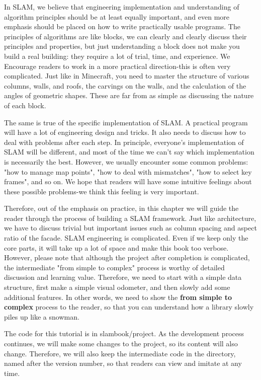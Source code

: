 In SLAM, we believe that engineering implementation and understanding of algorithm principles should be at least equally important, and even more emphasis should be placed on how to write practically usable programs. The principles of algorithms are like blocks, we can clearly and clearly discuss their principles and properties, but just understanding a block does not make you build a real building: they require a lot of trial, time, and experience. We Encourage readers to work in a more practical direction-this is often very complicated. Just like in Minecraft, you need to master the structure of various columns, walls, and roofs, the carvings on the walls, and the calculation of the angles of geometric shapes. These are far from as simple as discussing the nature of each block.

The same is true of the specific implementation of SLAM. A practical program will have a lot of engineering design and tricks. It also needs to discuss how to deal with problems after each step. In principle, everyone's implementation of SLAM will be different, and most of the time we can't say which implementation is necessarily the best. However, we usually encounter some common problems: "how to manage map points", "how to deal with mismatches", "how to select key frames", and so on. We hope that readers will have some intuitive feelings about these possible problems-we think this feeling is very important.

\clearpage
Therefore, out of the emphasis on practice, in this chapter we will guide the reader through the process of building a SLAM framework. Just like architecture, we have to discuss trivial but important issues such as column spacing and aspect ratio of the facade. SLAM engineering is complicated. Even if we keep only the core parts, it will take up a lot of space and make this book too verbose. However, please note that although the project after completion is complicated, the intermediate "from simple to complex" process is worthy of detailed discussion and learning value. Therefore, we need to start with a simple data structure, first make a simple visual odometer, and then slowly add some additional features. In other words, we need to show the \textbf{from simple to complex} process to the reader, so that you can understand how a library slowly piles up like a snowman.

The code for this tutorial is in slambook/project. As the development process continues, we will make some changes to the project, so its content will also change. Therefore, we will also keep the intermediate code in the directory, named after the version number, so that readers can view and imitate at any time.

